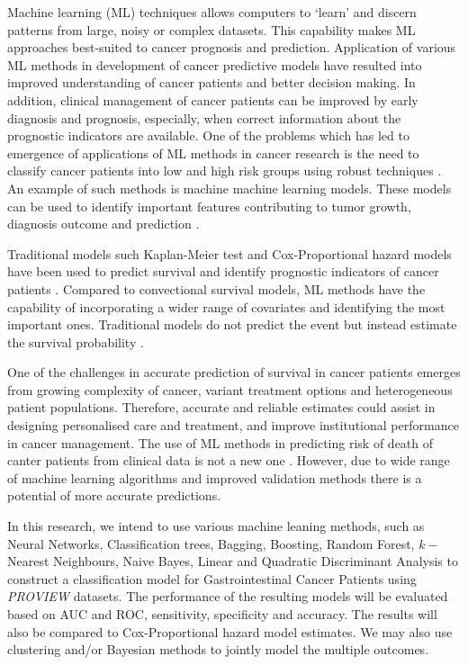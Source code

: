 Machine learning (ML) techniques allows computers to `learn' and discern patterns from large, noisy or complex datasets. This capability makes ML approaches best-suited to cancer prognosis and prediction. Application of various ML methods in development of cancer predictive models have resulted into improved understanding of cancer patients and better decision making. In addition, clinical management of cancer patients can be improved by early diagnosis and prognosis, especially, when correct information about the prognostic indicators are available. One of the problems which has led to emergence of applications of ML methods in cancer research is the need to classify cancer patients into low and high risk groups using robust techniques \cite{kourou2015machine}. An example of such methods is machine machine learning models. These models can be used to identify important features contributing to tumor growth, diagnosis outcome and prediction \citep{montazeri2016machine}.

Traditional models such Kaplan-Meier test and Cox-Proportional hazard models have been used to predict survival and identify prognostic indicators of cancer patients \citep{ganggayah2019predicting}. Compared to convectional survival models, ML methods have the capability of incorporating a wider range of covariates and identifying the most important ones. Traditional models do not predict the event but instead estimate the survival probability \citep{delen2005predicting}.

One of the challenges in accurate prediction of survival in cancer patients emerges from growing complexity of cancer, variant treatment options and heterogeneous patient populations. Therefore, accurate and reliable estimates could assist in designing personalised care and treatment, and improve institutional performance in cancer management. The use of ML methods in predicting risk of death of canter patients from clinical data is not a new one \citep{gupta2014machine}. However, due to wide range of machine learning algorithms and improved validation methods there is a potential of more accurate predictions.

In this research, we intend to use various machine leaning methods, such as Neural Networks, Classification trees, Bagging, Boosting, Random Forest, $k-$Nearest Neighbours, Naive Bayes, Linear and Quadratic Discriminant Analysis to construct a classification model for Gastrointestinal Cancer Patients using \textit{PROVIEW} datasets. The performance of the resulting models will be evaluated based on AUC and ROC, sensitivity, specificity and accuracy. The results will also be compared to Cox-Proportional hazard model estimates. We may also use clustering and/or Bayesian methods to jointly model the multiple outcomes.

